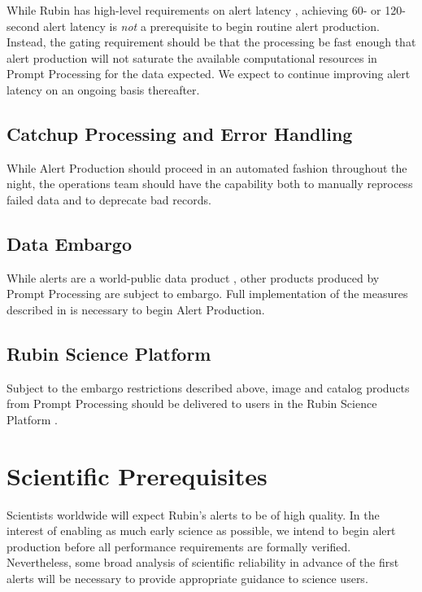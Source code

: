 \documentclass[OPS,authoryear,toc]{lsstdoc}
\begin{document}
While Rubin has high-level requirements on alert latency , achieving 60- or 120-second alert latency is \textit{not} a prerequisite to begin routine alert production.
Instead, the gating requirement should be that the processing be fast enough that alert production will not saturate the available computational resources in Prompt Processing for the data expected.
We expect to continue improving alert latency on an ongoing basis thereafter.

\subsection{Catchup Processing and Error Handling}

While Alert Production should proceed in an automated fashion throughout the night, the operations team should have the capability both to manually reprocess failed data and to deprecate bad records.


\subsection{Data Embargo}

While alerts are a world-public data product , other products produced by Prompt Processing are subject to embargo.
Full implementation of the measures described in  is necessary to begin Alert Production.

\subsection{Rubin Science Platform}
Subject to the embargo restrictions described above, image and catalog products from Prompt Processing should be delivered to users in the Rubin Science Platform .



\section{Scientific Prerequisites}

Scientists worldwide will expect Rubin's alerts to be of high quality.
In the interest of enabling as much early science as possible, we intend to begin alert production before all performance requirements are formally verified.  
Nevertheless, some broad analysis of scientific reliability in advance of the first alerts will be necessary to provide appropriate guidance to science users.
\end{document}
